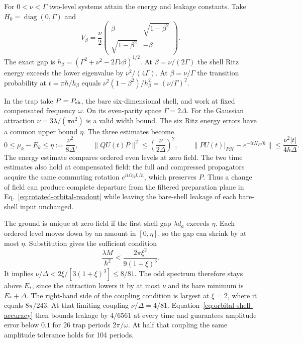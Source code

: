 \documentclass[11pt]{article}
\theoremstyle{definition}
\begin{document}
For $0<\nu<\Gamma$ two-level systems attain the energy and leakage constants. Take $H_0=\operatorname{diag}(0,\Gamma)$ and
\[
 V_\beta=\frac{\nu}{2}
 \begin{pmatrix}\beta&\sqrt{1-\beta^2}\\ \sqrt{1-\beta^2}&-\beta\end{pmatrix}.
\]
The exact gap is $h_\beta=(\Gamma^2+\nu^2-2\Gamma\nu\beta)^{1/2}$. At $\beta=\nu/(2\Gamma)$ the shell Ritz energy exceeds the lower eigenvalue by $\nu^2/(4\Gamma)$. At $\beta=\nu/\Gamma$ the transition probability at $t=\pi\hbar/h_\beta$ equals $\nu^2(1-\beta^2)/h_\beta^2=(\nu/\Gamma)^2$.

In the trap take $P=P_{\rm sh}$, the bare six-dimensional shell, and work at fixed compensated frequency $\omega$. On its even-parity space $\Gamma=2\Delta$. For the Gaussian attraction $\nu=3\lambda/(\pi a^2)$ is a valid width bound. The six Ritz energy errors have a common upper bound $\eta$. The three estimates become
\begin{equation}
 0\le\mu_k-E_k\le\eta:=\frac{\nu^2}{8\Delta},\qquad
 \|QU(t)P\|^2\le \left(\frac{\nu}{2\Delta}\right)^2,\qquad
 \big\|PU(t)|_{P\mathcal H}-e^{-itH_P/\hbar}\big\|
 \le \frac{\nu^2|t|}{4\hbar\Delta}.
 \label{eq:orbital-shell-accuracy}
\end{equation}
The energy estimate compares ordered even levels at zero field. The two time estimates also hold at compensated field: the full and compressed propagators acquire the same commuting rotation $e^{it\Omega_{\mathrm B}L/\hbar}$, which preserves $P$. Thus a change of field can produce complete departure from the filtered preparation plane in Eq.~\eqref{eq:rotated-orbital-readout} while leaving the bare-shell leakage of each bare-shell input unchanged.

The ground is unique at zero field if the first shell gap $\lambda d_a$ exceeds $\eta$. Each ordered level moves down by an amount in $[0,\eta]$, so the gap can shrink by at most $\eta$. Substitution gives the sufficient condition
\[
 \frac{\lambda M}{\hbar^2}<\frac{2\pi\xi^2}{9(1+\xi)^3}.
\]
It implies $\nu/\Delta<2\xi/[3(1+\xi)^3]\le8/81$. The odd spectrum therefore stays above $E_*$, since the attraction lowers it by at most $\nu$ and its bare minimum is $E_*+\Delta$. The right-hand side of the coupling condition is largest at $\xi=2$, where it equals $8\pi/243$. At that limiting coupling $\nu/\Delta=4/81$. Equation~\eqref{eq:orbital-shell-accuracy} then bounds leakage by $4/6561$ at every time and guarantees amplitude error below $0.1$ for 26 trap periods $2\pi/\omega$. At half that coupling the same amplitude tolerance holds for 104 periods.
\end{document}
